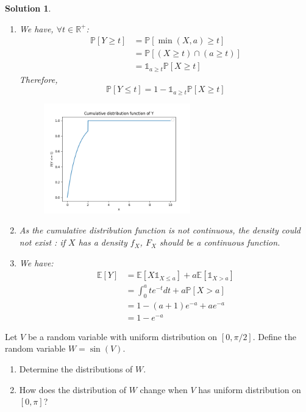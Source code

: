 \documentclass{article}
\newcommand{\proba}[1]{\mathbb{P}[#1]}
\newcommand{\esperance}[1]{\mathbb{E}[#1]}
\newcommand{\indicator}[1]{\mathbb{1}_{#1}}
\newcommand{\R}{\mathbb{R}}
\newtheorem{solution}{Solution}
\begin{document}
\begin{solution}
  \begin{enumerate}
    \item We have, $\forall t \in \R^+$:
          \begin{align*}
            \proba{Y \geq t} & = \proba{\min(X, a) \geq t}             \\
                             & = \proba{(X \geq t) \cap (a \geq t)}    \\
                             & = \indicator{a \geq t} \proba{X \geq t}
          \end{align*}
          Therefore,
          \[
            \proba{Y \leq t} = 1 - \indicator{a \geq t} \proba{X \geq t}
          \]
          \begin{figure}[h]
            \centering
            \includegraphics[width=0.6\textwidth]{cdf.png}
          \end{figure}
    \item As the cumulative distribution function is not continuous, the density could not exist : if $X$ has a density $f_X$, $F_X$ should be a continuous function.
    \item We have:
          \begin{align*}
            \esperance{Y} & = \esperance{X \mathbb{1}_{X \leq a} } + a \esperance{\mathbb{1}_{X>a}} \\
                          & = \int_0^a t e^{-t} dt + a \proba{X > a}                                \\
                          & = 1 - (a+1) e^{-a} + a e^{-a}                                           \\
                          & = 1 - e^{-a}
          \end{align*}
  \end{enumerate}
\end{solution}

\begin{Exercise} Let $V$ be a random variable with uniform distribution on $[0, \pi / 2]$. Define the random variable $W=\sin (V)$.
  \begin{enumerate}
    \item Determine the distributions of $W$.
    \item How does the distribution of $W$ change when $V$ has uniform distribution on
          $[0, \pi]$?
  \end{enumerate}
\end{Exercise}
\end{document}
